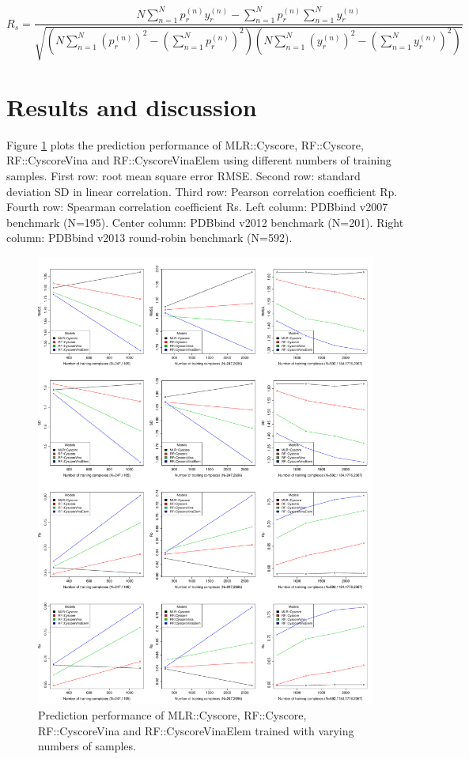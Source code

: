\begin{equation}
R_s = \frac{N\sum_{n=1}^Np_r^{(n)}y_r^{(n)}-\sum_{n=1}^Np_r^{(n)}\sum_{n=1}^Ny_r^{(n)}}{\sqrt{(N\sum_{n=1}^N(p_r^{(n)})^2-(\sum_{n=1}^Np_r^{(n)})^2)(N\sum_{n=1}^N(y_r^{(n)})^2-(\sum_{n=1}^Ny_r^{(n)})^2)}}
\label{rfcyscore:scor}
\end{equation}

\section{Results and discussion}

Figure \ref{rfcyscore:stat} plots the prediction performance of MLR::Cyscore, RF::Cyscore, RF::CyscoreVina and RF::CyscoreVinaElem using different numbers of training samples. First row: root mean square error RMSE. Second row: standard deviation SD in linear correlation. Third row: Pearson correlation coefficient Rp. Fourth row: Spearman correlation coefficient Rs. Left column: PDBbind v2007 benchmark (N=195). Center column: PDBbind v2012 benchmark (N=201). Right column: PDBbind v2013 round-robin benchmark (N=592).%

\begin{figure}
\includegraphics[width=\linewidth]{../rfcyscore/stat.pdf}
\caption{Prediction performance of MLR::Cyscore, RF::Cyscore, RF::CyscoreVina and RF::CyscoreVinaElem trained with varying numbers of samples.}
\label{rfcyscore:stat}
\end{figure}

